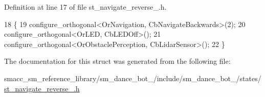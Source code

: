 Definition at line 17 of file st\+\_\+navigate\+\_\+reverse\+\_.\+h.


\begin{DoxyCode}
18    \{
19       configure\_orthogonal<OrNavigation, CbNavigateBackwards>(2);
20       configure\_orthogonal<OrLED, CbLEDOff>();
21       configure\_orthogonal<OrObstaclePerception, CbLidarSensor>();
22    \}
\end{DoxyCode}


The documentation for this struct was generated from the following file\+:\begin{DoxyCompactItemize}
\item 
smacc\+\_\+sm\+\_\+reference\+\_\+library/sm\+\_\+dance\+\_\+bot\+\_/include/sm\+\_\+dance\+\_\+bot\+\_/states/\hyperlink{3_2include_2sm__dance__bot__3_2states_2st__navigate__reverse__2_8h}{st\+\_\+navigate\+\_\+reverse\+\_.\+h}\end{DoxyCompactItemize}
